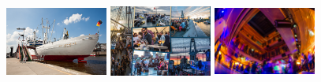 \begin{figure}[H]
	\centering
	\includegraphics[width=0.3\textwidth, height=3.5cm]{tex/images/social_event/san_diego.jpg}
	\includegraphics[width=0.3\textwidth, height=3.5cm]{tex/images/social_event/Collage_Open_Air.PNG}
	\includegraphics[width=0.3\textwidth, height=3.5cm]{tex/images/social_event/indoor_deck.jpg}
\end{figure}